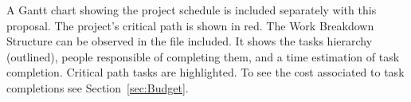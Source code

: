 
A Gantt chart showing the project schedule is included separately with this
proposal. The project's critical path is shown in red. The Work Breakdown Structure can be observed in the file included. It
shows the tasks hierarchy (outlined), people responsible of completing them, and
a time estimation of task completion. Critical path tasks are highlighted. To
see the cost associated to task completions see Section~\ref{sec:Budget}.
